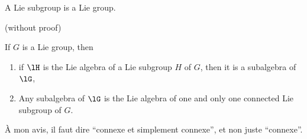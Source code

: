 \begin{lemma}
A Lie subgroup is a Lie group.
\end{lemma}
(without proof)

\begin{theorem}		\label{ThoSubGpSubAlg}		\label{tho:gp_alg}
If $G$ is a Lie group, then
\begin{enumerate}
\item\label{ThoSubGpSubAlgi} if $\lH$ is the Lie algebra of a Lie subgroup $H$ of $G$, then it is a subalgebra of $\lG$,
\item Any subalgebra of $\lG$ is the Lie algebra of one and only one connected Lie subgroup of $G$.
\end{enumerate}

\begin{probleme}
À mon avis, il faut dire ``connexe et simplement connexe'', et non juste ``connexe''.
\end{probleme}

\end{theorem}
